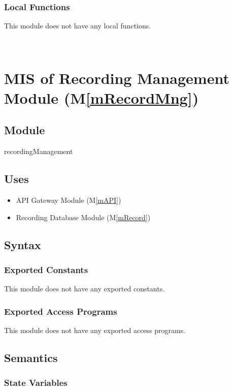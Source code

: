 \documentclass[12pt, titlepage]{article}
\newcommand{\mref}[1]{M\ref{#1}}
\begin{document}
\subsubsection{Local Functions}

This module does not have any local functions.

\ \

\section{MIS of Recording Management Module (\mref{mRecordMng})}

\subsection{Module}

recordingManagement

\subsection{Uses}

\begin{itemize}
  \item API Gateway Module (\mref{mAPI})
  \item Recording Database Module (\mref{mRecord})
\end{itemize}

\subsection{Syntax}

\subsubsection{Exported Constants}

This module does not have any exported constants.

\subsubsection{Exported Access Programs}

This module does not have any exported access programs.

\subsection{Semantics}

\subsubsection{State Variables}
\end{document}
